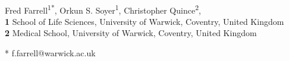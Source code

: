 \documentclass[10pt,letterpaper]{article}
\date{}
\begin{document}
\vspace*{0.2in}

\begin{flushleft}
{\Large
\textbf{} %
}
\newline
\\
Fred Farrell\textsuperscript{1*},
Orkun S. Soyer\textsuperscript{1},
Christopher Quince\textsuperscript{2},
\\
\bigskip
\textbf{1} School of Life Sciences, University of Warwick, Coventry, United Kingdom
\\\textbf{2} Medical School, University of Warwick, Coventry, United Kingdom
\\
\bigskip

% 
%





* f.farrell@warwick.ac.uk

\end{flushleft}
\end{document}
